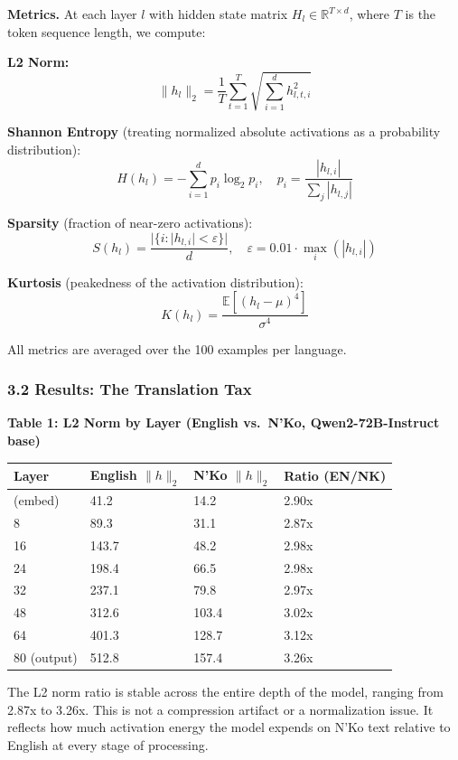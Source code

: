 \documentclass[
]{article}
\newcounter{none} %
\begin{document}
\textbf{Metrics.} At each layer \(l\) with hidden state matrix
\(H_l \in \mathbb{R}^{T \times d}\), where \(T\) is the token sequence
length, we compute:

\textbf{L2 Norm:}
\[\|h_l\|_2 = \frac{1}{T} \sum_{t=1}^{T} \sqrt{\sum_{i=1}^{d} h_{l,t,i}^2}\]

\textbf{Shannon Entropy} (treating normalized absolute activations as a
probability distribution):
\[H(h_l) = -\sum_{i=1}^{d} p_i \log_2 p_i, \quad p_i = \frac{|h_{l,i}|}{\sum_j |h_{l,j}|}\]

\textbf{Sparsity} (fraction of near-zero activations):
\[S(h_l) = \frac{|\{i : |h_{l,i}| < \varepsilon\}|}{d}, \quad \varepsilon = 0.01 \cdot \max_i(|h_{l,i}|)\]

\textbf{Kurtosis} (peakedness of the activation distribution):
\[K(h_l) = \frac{\mathbb{E}\left[(h_l - \mu)^4\right]}{\sigma^4}\]

All metrics are averaged over the 100 examples per language.

\subsubsection{3.2 Results: The Translation
Tax}\label{results-the-translation-tax}

\textbf{Table 1: L2 Norm by Layer (English vs.~N'Ko, Qwen2-72B-Instruct
base)}

{\def\LTcaptype{none} %
\begin{longtable}[]{@{}llll@{}}
\toprule\noalign{}
Layer & English \(\|h\|_2\) & N'Ko \(\|h\|_2\) & Ratio (EN/NK) \\
\midrule\noalign{}
\endhead
\bottomrule\noalign{}
\endlastfoot
0 (embed) & 41.2 & 14.2 & 2.90x \\
8 & 89.3 & 31.1 & 2.87x \\
16 & 143.7 & 48.2 & 2.98x \\
24 & 198.4 & 66.5 & 2.98x \\
32 & 237.1 & 79.8 & 2.97x \\
48 & 312.6 & 103.4 & 3.02x \\
64 & 401.3 & 128.7 & 3.12x \\
80 (output) & 512.8 & 157.4 & 3.26x \\
\end{longtable}
}

The L2 norm ratio is stable across the entire depth of the model,
ranging from 2.87x to 3.26x. This is not a compression artifact or a
normalization issue. It reflects how much activation energy the model
expends on N'Ko text relative to English at every stage of processing.
\end{document}
